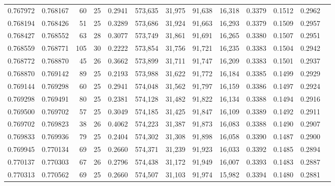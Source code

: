 \begin{tabular}{rrrrrrrrrrrrr}
0.767972 & 0.768167 &    60 &  25 &                                     0.2941 & 573,635 &  31,975 &  91,638 &  16,318 & 0.3379 & 0.1512 & 0.2962 \\
0.768194 & 0.768426 &    51 &  25 &                                     0.3289 & 573,686 &  31,924 &  91,663 &  16,293 & 0.3379 & 0.1509 & 0.2957 \\
0.768427 & 0.768552 &    63 &  28 &                                     0.3077 & 573,749 &  31,861 &  91,691 &  16,265 & 0.3380 & 0.1507 & 0.2951 \\
0.768559 & 0.768771 &   105 &  30 &                                     0.2222 & 573,854 &  31,756 &  91,721 &  16,235 & 0.3383 & 0.1504 & 0.2942 \\
0.768772 & 0.768870 &    45 &  26 &                                     0.3662 & 573,899 &  31,711 &  91,747 &  16,209 & 0.3383 & 0.1501 & 0.2937 \\
0.768870 & 0.769142 &    89 &  25 &                                     0.2193 & 573,988 &  31,622 &  91,772 &  16,184 & 0.3385 & 0.1499 & 0.2929 \\
0.769144 & 0.769298 &    60 &  25 &                                     0.2941 & 574,048 &  31,562 &  91,797 &  16,159 & 0.3386 & 0.1497 & 0.2924 \\
0.769298 & 0.769491 &    80 &  25 &                                     0.2381 & 574,128 &  31,482 &  91,822 &  16,134 & 0.3388 & 0.1494 & 0.2916 \\
0.769500 & 0.769702 &    57 &  25 &                                     0.3049 & 574,185 &  31,425 &  91,847 &  16,109 & 0.3389 & 0.1492 & 0.2911 \\
0.769702 & 0.769823 &    38 &  26 &                                     0.4062 & 574,223 &  31,387 &  91,873 &  16,083 & 0.3388 & 0.1490 & 0.2907 \\
0.769833 & 0.769936 &    79 &  25 &                                     0.2404 & 574,302 &  31,308 &  91,898 &  16,058 & 0.3390 & 0.1487 & 0.2900 \\
0.769945 & 0.770134 &    69 &  25 &                                     0.2660 & 574,371 &  31,239 &  91,923 &  16,033 & 0.3392 & 0.1485 & 0.2894 \\
0.770137 & 0.770303 &    67 &  26 &                                     0.2796 & 574,438 &  31,172 &  91,949 &  16,007 & 0.3393 & 0.1483 & 0.2887 \\
0.770313 & 0.770562 &    69 &  25 &                                     0.2660 & 574,507 &  31,103 &  91,974 &  15,982 & 0.3394 & 0.1480 & 0.2881 \\

\end{tabular}
